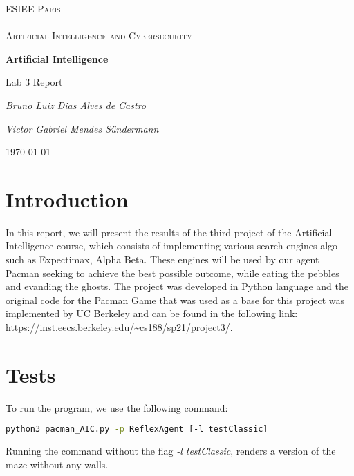 \documentclass{article}
\begin{document}
\begin{titlepage}
\centering
{\textsc{\Large ESIEE Paris \\ ~\\ Artificial Intelligence and Cybersecurity} \par}
\vfill
{\huge\bfseries Artificial Intelligence \par}
\vspace{0.5cm}
{\LARGE Lab 3 Report \par}
\vspace{2cm}
{\Large\itshape Bruno Luiz Dias Alves de Castro \par}
{\Large\itshape Victor Gabriel Mendes Sündermann \par}
\vfill

{\large \today\par}
\end{titlepage}

\pagebreak
\tableofcontents
\pagebreak

\section{Introduction}

In this report, we will present the results of the third project of the Artificial Intelligence course, which consists of implementing various search engines algo such as Expectimax, Alpha Beta.
These engines will be used by our agent Pacman seeking to achieve the best possible outcome, while eating the pebbles and evanding the ghosts.
The project was developed in Python language and the original code for the Pacman Game that was used as a base for this project was implemented by UC Berkeley and can be found in the following link: \url{https://inst.eecs.berkeley.edu/~cs188/sp21/project3/}.

\section{Tests}
To run the program, we use the following command:

\hbox{}

\begin{lstlisting}[language=bash, frame=tlbr, framesep=6pt, backgroundcolor=\color{light-gray}]
  python3 pacman_AIC.py -p ReflexAgent [-l testClassic]
\end{lstlisting}

\hbox{}

Running the command without the flag \textit{-l testClassic}, renders a version of the maze without any walls.
\end{document}
